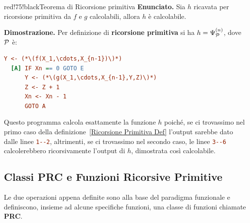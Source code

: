 
\newpage

\begin{halfframedbox}{red!75!black}{Teorema di Ricorsione primitiva}\label{Ricorsione Primitiva Teorema}
  \textbf{Enunciato.} Sia \(h\) ricavata per ricorsione primitiva da \(f\) e \(g\) calcolabili, allora \(h\) è calcolabile.

  \begin{center}
    \textcolor{red!75!black}{\hdashrule[0.5ex]{18cm}{1pt}{3mm 3pt 1mm 2pt}}
  \end{center}

  \textbf{Dimostrazione.} Per definizione di \textbf{ricorsione primitiva} si ha \(h=\Psi_{\mathcal{P}}^{(n)}\), dove \(\mathcal{P}\) è:
  \begin{lstlisting}[language=ini, autogobble=false, label={Teorema ricorsione primitiva},  caption=Dimostrazione Teorema di Ricorsione Primitiva]
      Y <- (*\(f(X_1,\cdots,X_{n-1})\)*)
  [A] IF Xn == 0 GOTO E
      Y <- (*\(g(X_1,\cdots,X_{n-1},Y,Z)\)*)
      Z <- Z + 1
      Xn <- Xn - 1
      GOTO A
  \end{lstlisting}
\end{halfframedbox}

Questo programma calcola esattamente la funzione \(h\) poiché, se ci trovassimo nel primo caso della definizione~\ref{Ricorsione Primitiva Def} l'output sarebbe dato dalle linee \lstinline[language=ini]{1--2}, altrimenti, se ci trovassimo nel secondo caso, le linee \lstinline[language=ini]{3--6} calcolerebbero ricorsivamente l'output di \(h\), dimostrata così calcolabile.

\subsection{Classi PRC e Funzioni Ricorsive Primitive}

Le due operazioni appena definite sono alla base del paradigma funzionale e definiscono, insieme ad alcune specifiche funzioni, una classe di funzioni chiamate \textbf{PRC}.

